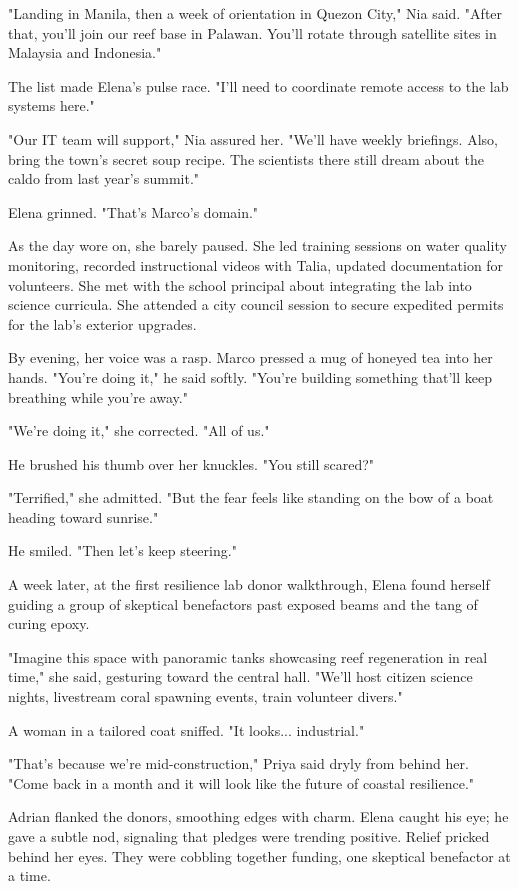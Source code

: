 "Landing in Manila, then a week of orientation in Quezon City," Nia said. "After that, you'll join our reef base in Palawan. You'll rotate through satellite sites in Malaysia and Indonesia."

The list made Elena's pulse race. "I'll need to coordinate remote access to the lab systems here."

"Our IT team will support," Nia assured her. "We'll have weekly briefings. Also, bring the town's secret soup recipe. The scientists there still dream about the caldo from last year's summit."

Elena grinned. "That's Marco's domain."

As the day wore on, she barely paused. She led training sessions on water quality monitoring, recorded instructional videos with Talia, updated documentation for volunteers. She met with the school principal about integrating the lab into science curricula. She attended a city council session to secure expedited permits for the lab's exterior upgrades.

By evening, her voice was a rasp. Marco pressed a mug of honeyed tea into her hands. "You're doing it," he said softly. "You're building something that'll keep breathing while you're away."

"We're doing it," she corrected. "All of us."

He brushed his thumb over her knuckles. "You still scared?"

"Terrified," she admitted. "But the fear feels like standing on the bow of a boat heading toward sunrise."

He smiled. "Then let's keep steering."

\bigskip

A week later, at the first resilience lab donor walkthrough, Elena found herself guiding a group of skeptical benefactors past exposed beams and the tang of curing epoxy.

"Imagine this space with panoramic tanks showcasing reef regeneration in real time," she said, gesturing toward the central hall. "We'll host citizen science nights, livestream coral spawning events, train volunteer divers."

A woman in a tailored coat sniffed. "It looks... industrial."

"That's because we're mid-construction," Priya said dryly from behind her. "Come back in a month and it will look like the future of coastal resilience."

Adrian flanked the donors, smoothing edges with charm. Elena caught his eye; he gave a subtle nod, signaling that pledges were trending positive. Relief pricked behind her eyes. They were cobbling together funding, one skeptical benefactor at a time.

